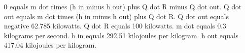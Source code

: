 0 equals m dot times (h in minus h out) plus Q dot R minus Q dot out.  
Q dot out equals m dot times (h in minus h out) plus Q dot R.  
Q dot out equals negative 62.785 kilowatts.  
Q dot R equals 100 kilowatts.  
m dot equals 0.3 kilograms per second.  
h in equals 292.51 kilojoules per kilogram.  
h out equals 417.04 kilojoules per kilogram.